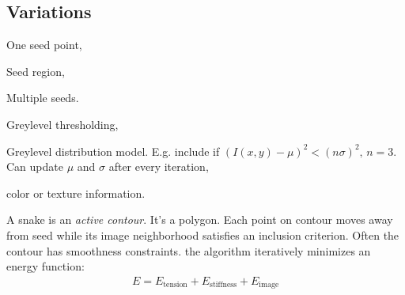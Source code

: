 \subsection{Variations}
\begin{compactdesc}
	\item[\lp{seed selection}] 
		\begin{inparaenum}[\itshape (1)]
			\item One seed point,
			\item Seed region,
			\item Multiple seeds.
		\end{inparaenum}
	\item[\lp{seed selection}] 
		\begin{inparaenum}[\itshape (1)]
			\item Greylevel thresholding,
			\item Greylevel distribution model. E.g. include if $\left( I(x,y)-\mu \right)^2<(n\sigma)^2,\, n=3$. Can update $\mu$ and $\sigma$ after every iteration,
			\item color or texture information.
		\end{inparaenum}
	\item[\lp{snakes}] A snake is an \emph{active contour}. It's a polygon. Each point on contour moves away from seed while its image neighborhood satisfies an inclusion criterion. Often the contour has smoothness constraints. the algorithm iteratively minimizes an energy function:
		\begin{gather*}
			E=E_{\text{tension}}+E_{\text{stiffness}}+E_{\text{image}}
		\end{gather*}
\end{compactdesc}
